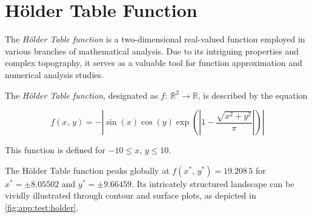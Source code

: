 \section{Hölder Table Function}
\label{sec:app:test:holder}
  The \emph{Hölder Table function} is a two-dimensional real-valued function
  employed in various branches of mathematical analysis.
  Due to its intriguing properties and complex topography, it serves as a
  valuable tool for function approximation and numerical analysis studies. 

  \begin{definition}
  \label{def:app:test:holder}
    The \emph{Hölder Table function}, designated as \(f:\: \mathbb{R}^2 \to
    \mathbb{R}\), is described by the equation

    \begin{equation}
      \label{eq:app:test:holder}
      f(x,\, y) = -\left|
        \sin(x)\cos(y)\exp\left(
          \left|1 - \frac{\sqrt{x^2 + y^2}}{\pi}\right|
        \right)
      \right|
    \end{equation}

    This function is defined for \(-10 \leq x,\, y \leq 10\).
  \end{definition}

  The Hölder Table function peaks globally at \(f(x^*,\, y^*) = 19.208\,5\) for
  \(x^* = \pm 8.05502\) and \(y^* = \pm 9.66459\).
  Its intricately structured landscape can be vividly illustrated through
  contour and surface plots, as depicted in \vref{fig:app:test:holder}.

